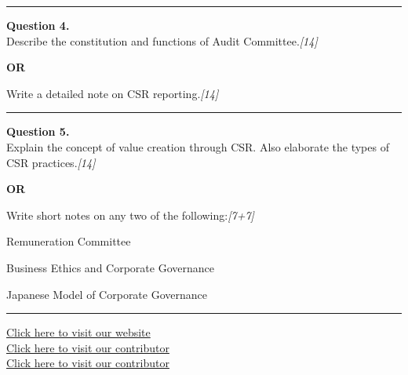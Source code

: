 \documentclass[11pt,a4paper]{article}
\newcommand{\pts}[1]{\hfill   \textit{[#1]}}
\begin{document}
\medskip\rule{\linewidth}{0.2pt}




\noindent   \textbf{Question 4.} \\
Describe the constitution and functions of Audit Committee.\pts{14}

\centerline{   \textbf{OR}}

Write a detailed note on CSR reporting.\pts{14}

\medskip\rule{\linewidth}{0.2pt}




\noindent   \textbf{Question 5.} \\
Explain the concept of value creation through CSR. Also elaborate the types of CSR practices.\pts{14}

\centerline{   \textbf{OR}}

Write short notes on any two of the following:\pts{7+7}

\begin{parts}
  \item Remuneration Committee
  \item Business Ethics and Corporate Governance
  \item Japanese Model of Corporate Governance
\end{parts}

\vfill
\rule{\linewidth}{0.4pt}

\begin{center}\small
  \href{https://bhu-exam.vercel.app/}{Click here to visit our website}\\[4pt]
  \href{https://me-aryan.vercel.app/}{Click here to visit our contributor}\\[4pt]
  \href{https://quashan-me.vercel.app/}{Click here to visit our contributor}
\end{center}
\end{document}

